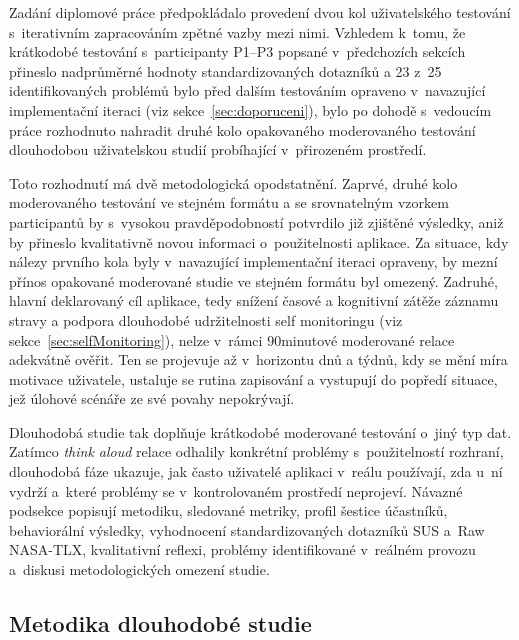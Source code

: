Zadání diplomové práce předpokládalo provedení dvou kol uživatelského testování s~iterativním zapracováním zpětné vazby mezi nimi.
Vzhledem k~tomu, že krátkodobé testování s~participanty P1--P3 popsané v~předchozích sekcích přineslo nadprůměrné hodnoty standardizovaných dotazníků a 23 z~25 identifikovaných problémů bylo před dalším testováním opraveno v~navazující implementační iteraci (viz sekce~\ref{sec:doporuceni}), bylo po dohodě s~vedoucím práce rozhodnuto nahradit druhé kolo opakovaného moderovaného testování dlouhodobou uživatelskou studií probíhající v~přirozeném prostředí.

Toto rozhodnutí má dvě metodologická opodstatnění.
Zaprvé, druhé kolo moderovaného testování ve stejném formátu a se srovnatelným vzorkem participantů by s~vysokou pravděpodobností potvrdilo již zjištěné výsledky, aniž by přineslo kvalitativně novou informaci o~použitelnosti aplikace.
Za situace, kdy nálezy prvního kola byly v~navazující implementační iteraci opraveny, by mezní přínos opakované moderované studie ve stejném formátu byl omezený.
Zadruhé, hlavní deklarovaný cíl aplikace, tedy snížení časové a kognitivní zátěže záznamu stravy a podpora dlouhodobé udržitelnosti self monitoringu (viz sekce~\ref{sec:selfMonitoring}), nelze v~rámci 90minutové moderované relace adekvátně ověřit.
Ten se projevuje až v~horizontu dnů a týdnů, kdy se mění míra motivace uživatele, ustaluje se rutina zapisování a vystupují do popředí situace, jež úlohové scénáře ze své povahy nepokrývají.

Dlouhodobá studie tak doplňuje krátkodobé moderované testování o~jiný typ dat.
Zatímco \emph{think aloud} relace odhalily konkrétní problémy s~použitelností rozhraní, dlouhodobá fáze ukazuje, jak často uživatelé aplikaci v~reálu používají, zda u~ní vydrží a~které problémy se v~kontrolovaném prostředí neprojeví.
Návazné podsekce popisují metodiku, sledované metriky, profil šestice účastníků, behaviorální výsledky, vyhodnocení standardizovaných dotazníků SUS a~Raw NASA-TLX, kvalitativní reflexi, problémy identifikované v~reálném provozu a~diskusi metodologických omezení studie.

\subsection{Metodika dlouhodobé studie}
\label{subsec:metodikaDlouhodobe}

